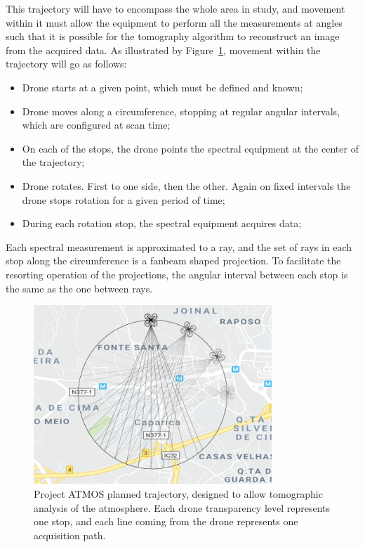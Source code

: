 This trajectory will have to encompass the whole area in study, and
movement within it must allow the equipment to perform all the
measurements at angles such that it is possible for the tomography
algorithm to reconstruct an image from the acquired data. As illustrated
by Figure~\ref{fig:trajectory_schematic}, movement within the trajectory
will go as follows:
\begin{itemize}
    \item Drone starts at a given point, which must be defined and
        known;
    \item Drone moves along a circumference, stopping at regular angular
        intervals, which are configured at scan time;
    \item On each of the stops, the drone points the spectral equipment
        at the center of the trajectory;
    \item Drone rotates. First to one side, then the other. Again on
        fixed intervals the drone stops rotation for a given period of
        time;
    \item During each rotation stop, the spectral equipment acquires
        data;
\end{itemize}

Each spectral measurement is approximated to a ray, and the set of rays
in each stop along the circumference is a fanbeam shaped projection. To
facilitate the resorting operation of the projections, the angular
interval between each stop is the same as the one between rays.

\begin{figure}[htpb]
    \centering
    \includegraphics[width=0.8\textwidth]{img/png/proj_schem.png}
    \caption{Project ATMOS planned trajectory, designed to allow
    tomographic analysis of the atmosphere. Each drone transparency
    level represents one stop, and each line coming from the drone
    represents one acquisition path.}
    \label{fig:trajectory_schematic}
\end{figure}

